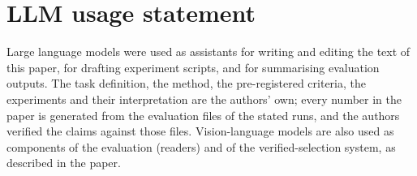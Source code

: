 \section*{LLM usage statement}
Large language models were used as assistants for writing and editing the text of this paper, for drafting experiment scripts, and for summarising evaluation outputs. The task definition, the method, the pre-registered criteria, the experiments and their interpretation are the authors' own; every number in the paper is generated from the evaluation files of the stated runs, and the authors verified the claims against those files. Vision-language models are also used as components of the evaluation (readers) and of the verified-selection system, as described in the paper.
